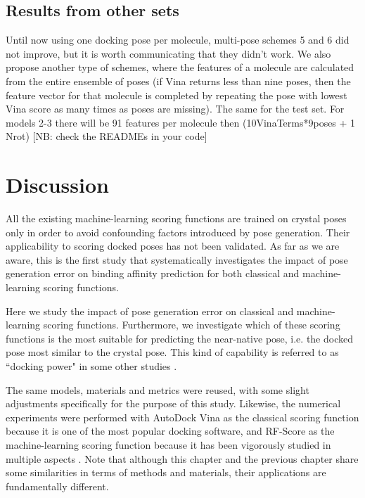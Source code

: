 \documentclass[twocolumn]{bmcart}
\begin{document}
\subsection*{Results from other sets}

Until now using one docking pose per molecule, multi-pose schemes 5 and 6 did not improve, but it is worth communicating that they didn’t work. We also propose another type of schemes, where the features of a molecule are calculated from the entire ensemble of poses (if Vina returns less than nine poses, then the feature vector for that molecule is completed by repeating the pose with lowest Vina score as many times as poses are missing). The same for the test set. For models 2-3 there will be 91 features per molecule then (10VinaTerms*9poses + 1 Nrot) [NB: check the READMEs in your code]

\section*{Discussion}

All the existing machine-learning scoring functions are trained on crystal poses only in order to avoid confounding factors introduced by pose generation. Their applicability to scoring docked poses has not been validated. As far as we are aware, this is the first study that systematically investigates the impact of pose generation error on binding affinity prediction for both classical and machine-learning scoring functions.

Here we study the impact of pose generation error on classical and machine-learning scoring functions. Furthermore, we investigate which of these scoring functions is the most suitable for predicting the near-native pose, i.e. the docked pose most similar to the crystal pose. This kind of capability is referred to as ``docking power" in some other studies \cite{1411}.

The same models, materials and metrics were reused, with some slight adjustments specifically for the purpose of this study. Likewise, the numerical experiments were performed with AutoDock Vina \cite{595} as the classical scoring function because it is one of the most popular docking software, and RF-Score \cite{564} as the machine-learning scoring function because it has been vigorously studied in multiple aspects \cite{1281,1362,1370}. Note that although this chapter and the previous chapter share some similarities in terms of methods and materials, their applications are fundamentally different.
\end{document}
